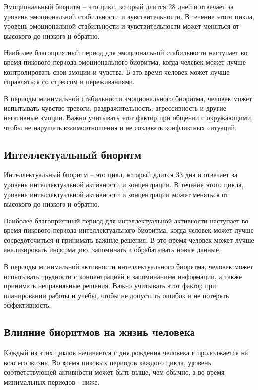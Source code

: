 Эмоциональный биоритм – это цикл, который длится 28 дней и отвечает за уровень эмоциональной стабильности и чувствительности. В течение этого цикла, уровень эмоциональной стабильности и чувствительности может меняться от высокого до низкого и обратно.

Наиболее благоприятный период для эмоциональной стабильности наступает во время пикового периода эмоционального биоритма, когда человек может лучше контролировать свои эмоции и чувства. В это время человек может лучше справляться со стрессом и переживаниями.

В периоды минимальной стабильности эмоционального биоритма, человек может испытывать чувство тревоги, раздражительность, агрессивность и другие негативные эмоции. Важно учитывать этот фактор при общении с окружающими, чтобы не нарушать взаимоотношения и не создавать конфликтных ситуаций.

\subsection{Интеллектуальный биоритм}

Интеллектуальный биоритм – это цикл, который длится 33 дня и отвечает за уровень интеллектуальной активности и концентрации. В течение этого цикла, уровень интеллектуальной активности и концентрации может меняться от высокого до низкого и обратно.

Наиболее благоприятный период для интеллектуальной активности наступает во время пикового периода интеллектуального биоритма, когда человек может лучше сосредоточиться и принимать важные решения. В это время человек может лучше анализировать информацию, запоминать и обрабатывать новые данные.

В периоды минимальной активности интеллектуального биоритма, человек может испытывать трудности с концентрацией и запоминанием информации, а также принимать неправильные решения. Важно учитывать этот фактор при планировании работы и учебы, чтобы не допустить ошибок и не потерять эффективность.

\subsection{Влияние биоритмов на жизнь человека}

Каждый из этих циклов начинается с дня рождения человека и продолжается на всю его жизнь. Во время пиковых периодов каждого цикла, уровень соответствующей активности может быть выше, чем обычно, а во время минимальных периодов - ниже.

